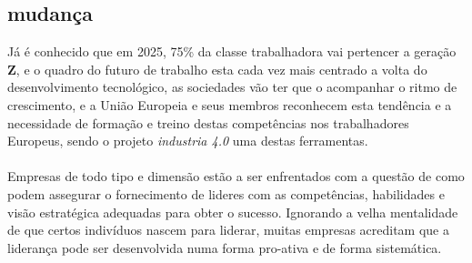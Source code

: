 \subsection{mudança}
Já é conhecido que em \textsf{2025}, 75\% da classe trabalhadora vai pertencer a geração \textbf{Z}, e o quadro do futuro de trabalho esta cada vez mais centrado a volta do desenvolvimento tecnológico, as sociedades vão ter que o acompanhar o ritmo de crescimento, e a União Europeia e seus membros reconhecem esta tendência e a necessidade de formação e treino destas competências nos trabalhadores Europeus, sendo o projeto \textit{industria 4.0} uma destas ferramentas.\\
\\
Empresas de todo tipo e dimensão estão a ser enfrentados com a questão de como podem assegurar o fornecimento de lideres com as competências, habilidades e visão estratégica adequadas para obter o sucesso. Ignorando a velha mentalidade de que certos indivíduos nascem para liderar, muitas empresas acreditam que a liderança pode ser desenvolvida numa forma pro-ativa e de forma sistemática.\cite{book_6}
